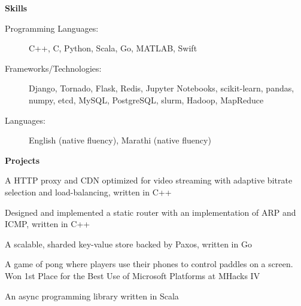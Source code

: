 \documentclass[letterpaper,11pt]{article}
\newcommand{\resheading}[1]{{\large \colorbox{mygrey}{\begin{minipage}{\textwidth}{\textbf{#1 \vphantom{p\^{E}}}}\end{minipage}}}}
\renewcommand{\footnotesize}{\fontsize{10pt}{11pt}\selectfont}
\begin{document}
		\resheading{Skills}
		\begin{description}
			\item[Programming Languages:]
			{	
				\footnotesize
				C++, C, Python, Scala, Go, MATLAB, Swift
			}
			\item[Frameworks/Technologies:]
			{
				\footnotesize
				Django, Tornado, Flask, Redis, Jupyter Notebooks, scikit-learn, pandas, numpy, etcd, MySQL, PostgreSQL, slurm, Hadoop, MapReduce
			}
			\item[Languages:]
			{
				\footnotesize
				English (native fluency), Marathi (native fluency)
			}
		\end{description} %
				
		\resheading{Projects}
		\begin{description}
			\item[VideoCDN:]
			{
				\footnotesize
				A HTTP proxy and CDN optimized for video streaming with adaptive bitrate selection and load-balancing, written in C++
			}
			\item[StaticRouter:]
			{
				\footnotesize
				Designed and implemented a static router with an implementation of ARP and ICMP, written in C++
			\item[ShardKV:]
			{
				\footnotesize
				A scalable, sharded key-value store backed by Paxos, written in Go
			}

			}
			\item[PongWithMe:]
			{
				\footnotesize
				A game of pong where players use their phones to control paddles on a screen. Won 1st Place for the Best Use of Microsoft Platforms at MHacks IV
			}
							
			\item[Spar:]
			{
				\footnotesize
				An async programming library written in Scala
			}				
		\end{description}
						
						
\end{document}

